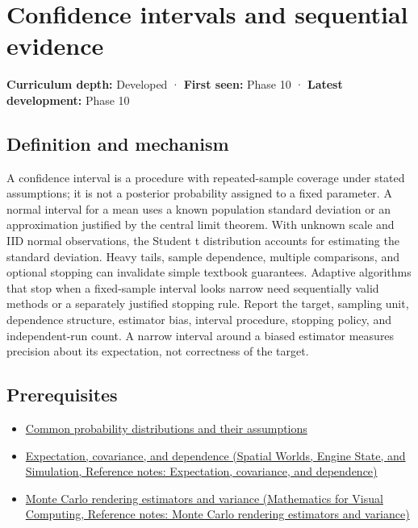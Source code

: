\hypertarget{appendix-c83016554b1e}{}\label{referencestart:appendix-c83016554b1e}
\section{Confidence intervals and sequential evidence}\label{appendix-c83016554b1e-confidence-intervals-and-sequential-evidence}

\textbf{Curriculum depth:} Developed · \textbf{First seen:} Phase 10 · \textbf{Latest development:} Phase 10

\subsection{Definition and mechanism}\label{appendix-c83016554b1e-definition-and-mechanism}

A confidence interval is a procedure with repeated-sample coverage under stated assumptions; it is not a posterior probability assigned to a fixed parameter. A normal interval for a mean uses a known population standard deviation or an approximation justified by the central limit theorem. With unknown scale and IID normal observations, the Student t distribution accounts for estimating the standard deviation. Heavy tails, sample dependence, multiple comparisons, and optional stopping can invalidate simple textbook guarantees. Adaptive algorithms that stop when a fixed-sample interval looks narrow need sequentially valid methods or a separately justified stopping rule. Report the target, sampling unit, dependence structure, estimator bias, interval procedure, stopping policy, and independent-run count. A narrow interval around a biased estimator measures precision about its expectation, not correctness of the target.

\subsection{Prerequisites}\label{appendix-c83016554b1e-prerequisites}

\begin{itemize}
\tightlist
\item
  \hyperref[appendix-a2360b435383]{Common probability distributions and their assumptions}
\item
  \href{../05-Spatial-Worlds-Engine-State-and-Simulation/main.pdf\#nameddest=appendix-54c383df9992}{Expectation, covariance, and dependence (Spatial Worlds, Engine State, and Simulation, Reference notes: Expectation, covariance, and dependence)}
\item
  \href{../02-Mathematics-for-Visual-Computing/main.pdf\#nameddest=appendix-031e02bf28af}{Monte Carlo rendering estimators and variance (Mathematics for Visual Computing, Reference notes: Monte Carlo rendering estimators and variance)}
\end{itemize}

